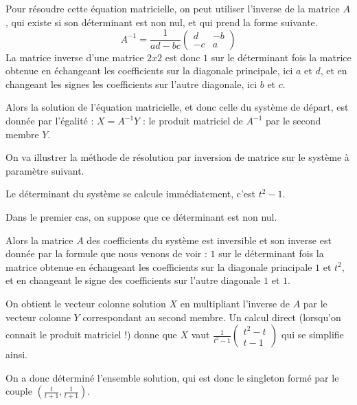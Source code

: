 \change

Pour résoudre cette équation matricielle, on peut utiliser l'inverse de la matrice $A$, 
qui existe si son déterminant est non nul, et qui prend la forme suivante. 
$$A^{-1} = \frac{1}{ad-bc} \begin{pmatrix} d & -b \\ -c & a \end{pmatrix}$$
La matrice inverse d'une matrice $2x2$ est donc $1$ sur le déterminant fois la matrice 
obtenue en échangeant les coefficients sur la diagonale principale, ici $a$ et $d$, 
et en changeant les signes les coefficients sur l'autre diagonale, ici \(b\) et \(c\).


\change

Alors la solution de l'équation matricielle, et donc celle du système de départ, 
est donnée par l'égalité : $X = A^{-1} Y$ : le produit matriciel de $A^{-1}$ 
par le second membre $Y$.

\diapo

On va illustrer la méthode de résolution par inversion de matrice sur le système à paramètre suivant.

\change

Le déterminant du système se calcule immédiatement, c'est $t^2-1$.

\change

Dans le premier cas, on suppose que ce déterminant est non nul. 

\change

Alors la matrice $A$ des coefficients du système est inversible et son inverse est donnée par la formule que nous venons de voir : $1$ sur le déterminant fois la matrice obtenue en échangeant les coefficients sur la diagonale principale $1$ et $t^2$, et en changeant le signe des coefficients sur l'autre diagonale $1$ et $1$.

\change

On obtient le vecteur colonne solution $X$ en multipliant l'inverse de $A$ 
par le vecteur colonne $Y$ correspondant au second membre. 
Un calcul direct (lorsqu'on connait le produit matriciel !) 
donne que $X$ vaut $\frac{1}{t^2-1}\begin{pmatrix} t^2-t\\ t-1 \end{pmatrix}$
qui se simplifie ainsi.

\change

On a donc déterminé l'ensemble solution, qui est donc le singleton formé par le couple $\left(\frac{t}{t+1},\frac{1}{t+1}\right)$.



